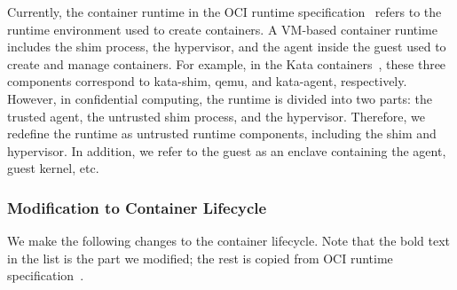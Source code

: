 Currently, the container runtime in the OCI runtime specification~\cite*{oci-runtime-spec} refers to the runtime environment used to create containers. A VM-based container runtime includes the shim process, the hypervisor, and the agent inside the guest used to create and manage containers. 
For example, in the Kata containers~\cite*{Kata-Containers}, these three components correspond to kata-shim, qemu, and kata-agent, respectively. However, in confidential computing, the runtime is divided into two parts: the trusted agent, the untrusted shim process, and the hypervisor. Therefore, we redefine 
the runtime as untrusted runtime components, including the shim and hypervisor. In addition, we refer to the guest as an enclave containing the agent, guest kernel, etc.

\subsubsection{Modification to Container Lifecycle}
We make the following changes to the container lifecycle. Note that the bold text in the list is the part we modified; the rest is copied from OCI runtime specification~\cite*{oci-runtime-spec}.

